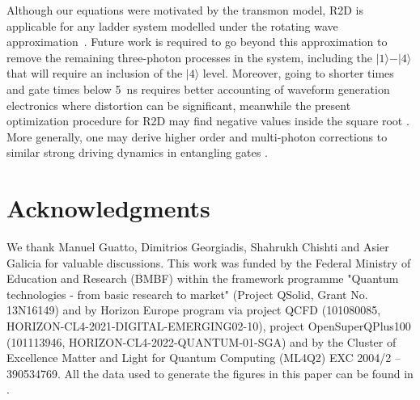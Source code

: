 \documentclass[superscriptaddress,amsmath,amssymb,aps,twocolumn,praplied,notitlepage]{revtex4-2}
\newcommand{\ket}[1]{\vert #1 \rangle}
\begin{document}
Although our equations were motivated by the transmon model, R2D is applicable for any ladder system modelled under the rotating wave approximation~\cite{PhysRevA.88.062318}. Future work is required to go beyond this approximation to remove the remaining three-photon processes in the system,  including the $\ket{1}-\ket{4}$ that will require an inclusion of the $\ket{4}$ level. Moreover, going to shorter times and gate times below 5~ns requires better accounting of waveform generation electronics where distortion can be significant, meanwhile the present optimization procedure for R2D may find negative values inside the square root \cite{GAO2025}. More generally, one may derive higher order and multi-photon corrections to similar strong driving dynamics in entangling gates \cite{kirchhoff2025correction}.


\section*{Acknowledgments}
We thank Manuel Guatto, Dimitrios Georgiadis, Shahrukh Chishti and Asier Galicia for valuable discussions. This work was funded by the Federal Ministry of Education and Research (BMBF) within the framework programme "Quantum technologies - from basic research to market" (Project QSolid, Grant No. 13N16149) and by Horizon Europe program via project QCFD (101080085, HORIZON-CL4-2021-DIGITAL-EMERGING02-10), project OpenSuperQPlus100 (101113946, HORIZON-CL4-2022-QUANTUM-01-SGA) and by the Cluster of Excellence Matter and Light for Quantum Computing (ML4Q2) EXC 2004/2 – 390534769. 
All the data used to generate the figures in this paper can be found in \cite{Repo}.


\appendix
\end{document}
